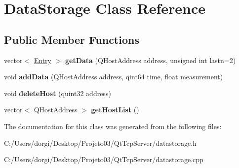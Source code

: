\hypertarget{class_data_storage}{}\section{Data\+Storage Class Reference}
\label{class_data_storage}
\subsection*{Public Member Functions}
\begin{DoxyCompactItemize}
\item 
\mbox{\label{class_data_storage_a716fe9bd808cb8ea9f0ef153bf01a633}} 
vector$<$ \mbox{\hyperlink{struct_entry}{Entry}} $>$ {\bfseries get\+Data} (Q\+Host\+Address address, unsigned int lastn=2)
\item 
\mbox{\label{class_data_storage_ab46b18762db5b17b3e0a97150079cb78}} 
void {\bfseries add\+Data} (Q\+Host\+Address address, qint64 time, float measurement)
\item 
\mbox{\label{class_data_storage_a6d1d74566ca198c807a9dbbb16019472}} 
void {\bfseries delete\+Host} (quint32 address)
\item 
\mbox{\label{class_data_storage_a05e60f4e62fb68f588e3f381d40b6bbd}} 
vector$<$ Q\+Host\+Address $>$ {\bfseries get\+Host\+List} ()
\end{DoxyCompactItemize}


The documentation for this class was generated from the following files\+:\begin{DoxyCompactItemize}
\item 
C\+:/\+Users/dorgi/\+Desktop/\+Projeto03/\+Qt\+Tcp\+Server/datastorage.\+h\item 
C\+:/\+Users/dorgi/\+Desktop/\+Projeto03/\+Qt\+Tcp\+Server/datastorage.\+cpp\end{DoxyCompactItemize}
